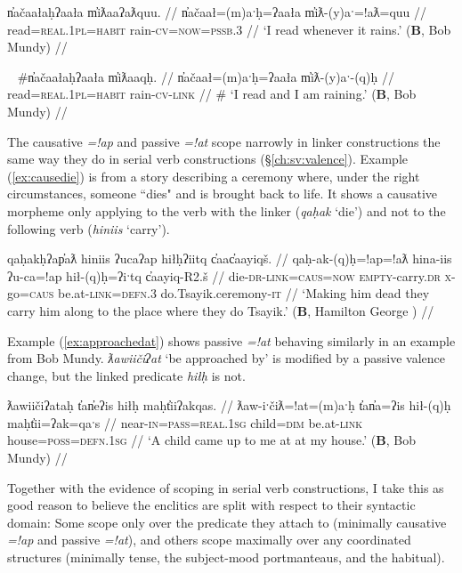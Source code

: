\ex \label{ex:readrain}
\begingl
\glpreamble n̓ačaałaḥʔaała m̓iƛaaʔaƛquu. //
\gla n̓ačaał=(m)aˑḥ=ʔaała m̓iƛ-(y)aˑ=!aƛ=quu //
\glb read=\textsc{real.1pl}=\textsc{habit} rain-\textsc{cv}=\textsc{now}=\textsc{pssb.3} //
\glft `I read whenever it rains.' (\textbf{B}, Bob Mundy) //
\endgl
\xe

\ex~ \label{ex:readrain2}
\begingl
\glpreamble \#n̓ačaałaḥʔaała m̓iƛaaqḥ. //
\gla n̓ačaał=(m)aˑḥ=ʔaała m̓iƛ-(y)aˑ-(q)ḥ //
\glb read=\textsc{real.1pl}=\textsc{habit} rain-\textsc{cv}-\textsc{link} //
\glft \# `I read and I am raining.' (\textbf{B}, Bob Mundy) //
\endgl
\xe

The causative \textit{=!ap} and passive \textit{=!at} scope narrowly in linker constructions the same way they do in serial verb constructions (\S\ref{ch:sv:valence}). Example (\ref{ex:causedie}) is from a story describing a ceremony where, under the right circumstances, someone ``dies" and is brought back to life. It shows a causative morpheme only applying to the verb with the linker (\textit{qaḥak} `die') and not to the following verb (\textit{hiniis} `carry').

\ex \label{ex:causedie}
\begingl
\glpreamble qaḥakḥʔap̓aƛ hiniis ʔucaʔap hiłḥʔiitq c̓aac̓aayiqš. //
\gla qaḥ-ak-(q)ḥ=!ap=!aƛ hina-iis ʔu-ca=!ap hił-(q)ḥ=ʔiˑtq c̓aayiq-R2.š //
\glb die-\textsc{dr}-\textsc{link}=\textsc{caus}=\textsc{now} \textsc{empty}-carry.\textsc{dr} \textsc{x}-go=\textsc{caus} be.at-\textsc{link}=\textsc{defn.3} do.Tsayik.ceremony-\textsc{it} //
\glft `Making him dead they carry him along to the place where they do Tsayik.' (\textbf{B}, Hamilton George \cite[106]{sapir1939}) //
\endgl
\xe

Example (\ref{ex:approachedat}) shows passive \textit{=!at} behaving similarly in an example from Bob Mundy. \textit{ƛawiičiʔat} `be approached by' is modified by a passive valence change, but the linked predicate \textit{hiłḥ} is not.

\ex \label{ex:approachedat}
\begingl
\glpreamble ƛawiičiʔataḥ t̓an̓eʔis hiłḥ maḥt̓iiʔakqas. //
\gla ƛaw-iˑčiƛ=!at=(m)aˑḥ t̓an̓a=ʔis hił-(q)ḥ maḥt̓ii=ʔak=qaˑs //
\glb near-\textsc{in}=\textsc{pass}=\textsc{real.1sg} child=\textsc{dim} be.at-\textsc{link} house=\textsc{poss}=\textsc{defn.1sg} //
\glft `A child came up to me at at my house.' (\textbf{B}, Bob Mundy) //
\endgl
\xe

Together with the evidence of scoping in serial verb constructions, I take this as good reason to believe the enclitics are split with respect to their syntactic domain: Some scope only over the predicate they attach to (minimally causative \textit{=!ap} and passive \textit{=!at}), and others scope maximally over any coordinated structures (minimally tense, the subject-mood portmanteaus, and the habitual).

